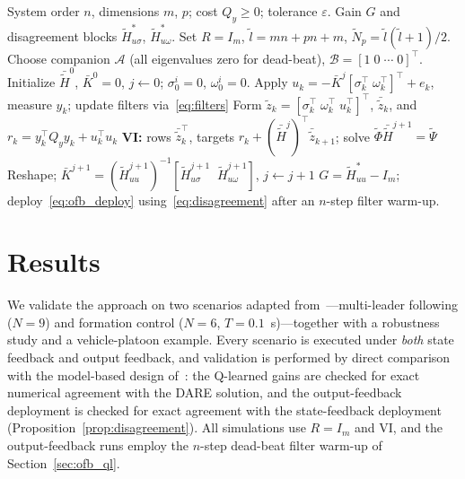 \documentclass[final,5p,times]{elsarticle}
\theoremstyle{plain}
\theoremstyle{definition}
\theoremstyle{remark}
\begin{document}
\begin{algorithm}[!htb]
\caption{Output Feedback Q-Learning for Consensus Gains}
\label{alg:ofb_ql}
{\footnotesize
\begin{algorithmic}[1]
\REQUIRE System order $n$, dimensions $m$, $p$; cost $Q_y \geq 0$; tolerance $\varepsilon$.
\ENSURE Gain $G$ and disagreement blocks $\tilde{H}_{u\sigma}^*$, $\tilde{H}_{u\omega}^*$.
\STATE Set $R = I_m$, $\tilde{l} = mn + pn + m$, $\tilde{N}_p = \tilde{l}(\tilde{l}+1)/2$.
\STATE Choose companion $\mathcal{A}$ (all eigenvalues zero for dead-beat), $\mathcal{B} = [1 \; 0 \; \cdots \; 0]^\top$.
\STATE Initialize $\bar{\tilde{H}}^0$, $\bar{K}^0 = 0$, $j \leftarrow 0$; $\sigma_0^i = 0$, $\omega_0^i = 0$.
    \STATE Apply $u_k = -\bar{K}^j [\sigma_k^\top \; \omega_k^\top]^\top + e_k$, measure $y_k$; update filters via~\eqref{eq:filters}
    \STATE Form $\tilde{z}_k = [\sigma_k^\top \; \omega_k^\top \; u_k^\top]^\top$, $\bar{\tilde{z}}_k$, and $r_k = y_k^\top Q_y y_k + u_k^\top u_k$
\ENDFOR
\REPEAT
    \STATE \textbf{VI:} rows $\bar{\tilde{z}}_k^\top$, targets $r_k + (\bar{\tilde{H}}^j)^\top \bar{\tilde{z}}_{k+1}$; solve $\tilde{\Phi} \bar{\tilde{H}}^{j+1} = \tilde{\Psi}$
    \STATE Reshape; $\bar{K}^{j+1} = (\tilde{H}_{uu}^{j+1})^{-1} [\tilde{H}_{u\sigma}^{j+1} \;\; \tilde{H}_{u\omega}^{j+1}]$, \; $j \leftarrow j + 1$
\STATE $G = \tilde{H}_{uu}^* - I_m$; deploy~\eqref{eq:ofb_deploy} using~\eqref{eq:disagreement} after an $n$-step filter warm-up.
\end{algorithmic}}
\end{algorithm}
\section{Results}
\label{sec:results}
We validate the approach on two scenarios adapted from~\cite{cacace2024}---multi-leader following ($N{=}9$) and formation control ($N{=}6$, $T = 0.1$~s)---together with a robustness study and a vehicle-platoon example. Every scenario is executed under \emph{both} state feedback and output feedback, and validation is performed by direct comparison with the model-based design of~\cite{cacace2024}: the Q-learned gains are checked for exact numerical agreement with the DARE solution, and the output-feedback deployment is checked for exact agreement with the state-feedback deployment (Proposition~\ref{prop:disagreement}). All simulations use $R = I_m$ and VI, and the output-feedback runs employ the $n$-step dead-beat filter warm-up of Section~\ref{sec:ofb_ql}.
\end{document}
